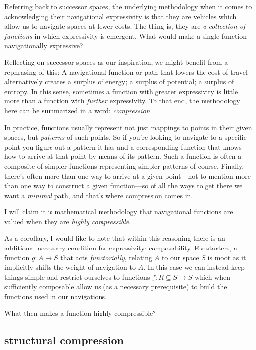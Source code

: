 \documentclass[twoside]{article}
\begin{document}
Referring back to successor spaces, the underlying methodology when it comes to acknowledging their navigational
expressivity is that they are vehicles which allow us to navigate spaces at lower costs. The thing is, they are
\emph{a collection of functions} in which expressivity is emergent. What would make a single function navigationally
expressive?

Reflecting on successor spaces as our inspiration, we might benefit from a rephrasing of this: A navigational function
or path that lowers the cost of travel alternatively creates a surplus of energy; a surplus of potential; a surplus
of entropy. In this sense, sometimes a function with greater expressivity is little more than a function with
\emph{further} expressivity. To that end, the methodology here can be summarized in a word: \emph{compression}.

In practice, functions usually represent not just mappings to points in their given spaces, but \emph{patterns}
of such points. So if you're looking to navigate to a specific point you figure out a pattern it has and a
corresponding function that knows how to arrive at that point by means of its pattern. Such a function is often
a composite of simpler functions representing simpler patterns of course. Finally, there's often more than one way
to arrive at a given point---not to mention more than one way to construct a given function---so of all the ways
to get there we want a \emph{minimal} path, and that's where compression comes in.

I will claim it is mathematical methodology that navigational functions are valued when they are
\emph{highly compressible}.

As a corollary, I would like to note that within this reasoning there is an additional necessary condition
for expressivity: composability. For starters, a function $ g:A\to S $ that acts \emph{functorially}, relating
$ A $ to our space $ S $ is moot as it implicitly shifts the weight of navigation to $ A $. In this case we can
instead keep things simple and restrict ourselves to functions $ f:R\subseteq S\to S $ which when sufficiently
composable allow us (as a necessary prerequisite) to build the functions used in our navigations.

What then makes a function highly compressible?

\subsection*{structural compression}
\end{document}
